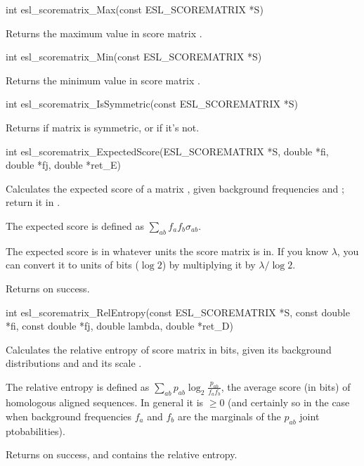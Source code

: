 \begin{sreapi}
\hypertarget{func:esl_scorematrix_Max()}
{\item[int esl\_scorematrix\_Max(const ESL\_SCOREMATRIX *S)]}

Returns the maximum value in score matrix .


\hypertarget{func:esl_scorematrix_Min()}
{\item[int esl\_scorematrix\_Min(const ESL\_SCOREMATRIX *S)]}

Returns the minimum value in score matrix .


\hypertarget{func:esl_scorematrix_IsSymmetric()}
{\item[int esl\_scorematrix\_IsSymmetric(const ESL\_SCOREMATRIX *S)]}

Returns  if matrix  is symmetric,
or  if it's not.


\hypertarget{func:esl_scorematrix_ExpectedScore()}
{\item[int esl\_scorematrix\_ExpectedScore(ESL\_SCOREMATRIX *S, double *fi, double *fj, double *ret\_E)]}

Calculates the expected score of a matrix ,
given background frequencies  and ;
return it in .

The expected score is defined as
$\sum_{ab} f_a f_b \sigma_{ab}$.

The expected score is in whatever units the score matrix
 is in. If you know $\lambda$, you can convert it to
units of bits ($\log 2$) by multiplying it by $\lambda /
\log 2$.

Returns  on success.


\hypertarget{func:esl_scorematrix_RelEntropy()}
{\item[int esl\_scorematrix\_RelEntropy(const ESL\_SCOREMATRIX *S, const double *fi, const double *fj, double lambda, double *ret\_D)]}

Calculates the relative entropy of score matrix  in
bits, given its background distributions  and  and
its scale .

The relative entropy is defined as $\sum_{ab} p_{ab}
\log_2 \frac{p_{ab}} {f_a f_b}$, the average score (in
bits) of homologous aligned sequences. In general it is
$\geq 0$ (and certainly so in the case when background
frequencies $f_a$ and $f_b$ are the marginals of the
$p_{ab}$ joint ptobabilities).

Returns  on success, and  contains the relative
entropy.


\end{sreapi}

